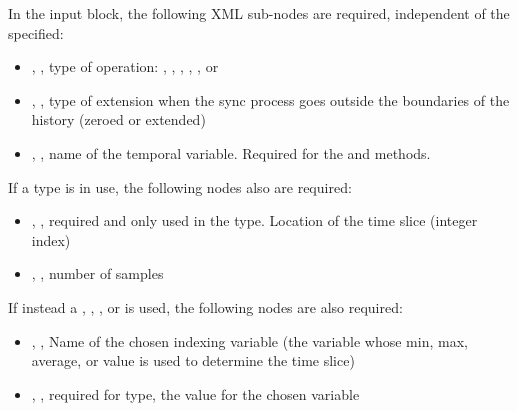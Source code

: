 In the  input block, the following XML sub-nodes are required,
independent of the  specified:

\begin{itemize}
  \item {}, , type of operation: , ,
                        , , , or 
   \item {}, , type of extension when the sync process goes outside the boundaries of the history (zeroed or extended)
   \item {}, , name of the temporal variable.  Required for the
      and  methods.
\end{itemize}

If a  type is in use, the following nodes also are required:
\begin{itemize}
   \item {}, , required and only used in the
      type.  Location of the time slice (integer index)
   \item {}, , number of samples
\end{itemize}

If instead a , , , or  is used, the following nodes
are also required:
\begin{itemize}
   \item {}, ,  Name of the chosen indexing variable (the
         variable whose min, max, average, or value is used to determine the time slice)
       \item {}, ,  required for  type, the value for the chosen variable
\end{itemize}

